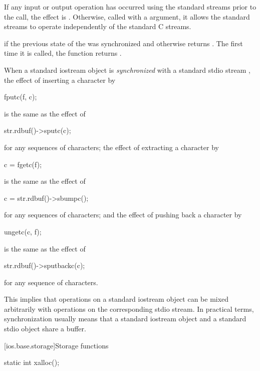 \begin{itemdescr}
\pnum
\effects
If any input or output operation has occurred using the standard streams prior to the
call, the effect is
.
Otherwise, called with a  argument, it allows the standard streams to
operate independently of the standard C streams.

\pnum
\returns
{}
if the previous state of the 
was synchronized and otherwise returns
.
The first time it is called,
the function returns
.

\pnum
\remarks
When a standard iostream object  is
\textit{synchronized}
with a standard stdio stream , the effect of inserting a character  by
\begin{codeblock}
fputc(f, c);
\end{codeblock}
is the same as the effect of
\begin{codeblock}
str.rdbuf()->sputc(c);
\end{codeblock}
for any sequences of characters; the effect of extracting a character  by
\begin{codeblock}
c = fgetc(f);
\end{codeblock}
is the same as the effect of
\begin{codeblock}
c = str.rdbuf()->sbumpc();
\end{codeblock}
for any sequences of characters; and the effect of pushing back a character  by
\begin{codeblock}
ungetc(c, f);
\end{codeblock}
is the same as the effect of
\begin{codeblock}
str.rdbuf()->sputbackc(c);
\end{codeblock}
for any sequence of characters.
\begin{footnote}
This implies that operations on a standard iostream object can be mixed arbitrarily
with operations on the corresponding stdio stream. In practical terms, synchronization
usually means that a standard iostream object and a standard stdio object share a
buffer.
\end{footnote}
\end{itemdescr}

[ios.base.storage]{Storage functions}

%
\begin{itemdecl}
static int xalloc();
\end{itemdecl}

